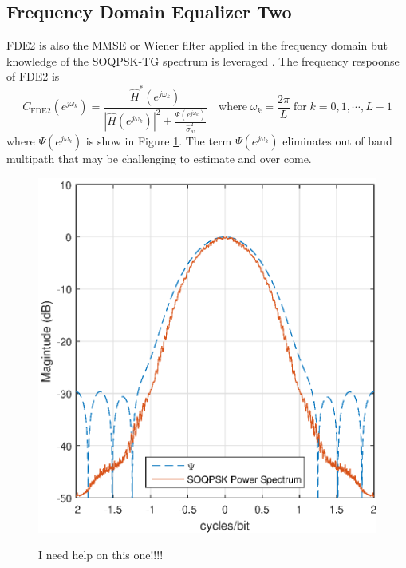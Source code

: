 \subsection{Frequency Domain Equalizer Two}
FDE2 is also the MMSE or Wiener filter applied in the frequency domain but knowledge of the SOQPSK-TG spectrum is leveraged \cite[eq. (12)]{williams2013linear}.
The frequency respoonse of FDE2 is
\begin{equation}
C_\text{FDE2}(e^{j\omega_k}) = \frac{\hat{H}^\ast(e^{j\omega_k})}  {|\hat{H}(e^{j\omega_k})|^2  +  \frac{\Psi(e^{j\omega_k})}{\hat{\sigma}^2_w}} \quad
\text{where} \;
\omega_k = \frac{2\pi}{L} \;
\text{for} \;
k=0,1,\cdots,L-1
\label{eq:FDE2}
\end{equation}
where $\Psi(e^{j\omega_k})$ is show in Figure \ref{fig:SOQPSK_spectrum}.
The term $\Psi(e^{j\omega_k})$ eliminates out of band multipath that may be challenging to estimate and over come.
\begin{figure}
	\caption{I need help on this one!!!! }
	\centering\includegraphics[width=5in]{figures/eq_equations/FDE2_spectrum_PSI.eps}
	\label{fig:SOQPSK_spectrum}
\end{figure}
